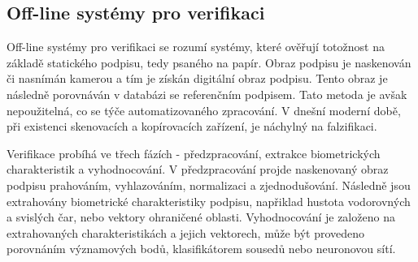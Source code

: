 \subsection{Off-line systémy pro verifikaci}
Off-line systémy pro verifikaci se rozumí systémy, které ověřují totožnost na základě statického podpisu, tedy psaného na papír.  %
Obraz podpisu je naskenován či nasnímán kamerou a tím je získán digitální obraz podpisu.                                          %
Tento obraz je následně porovnáván v databázi se referenčním podpisem.                                                            %
Tato metoda je avšak nepoužitelná, co se týče automatizovaného zpracování.                                                        %
V dnešní moderní době, při existenci skenovacích a kopírovacích zařízení, je náchylný na falzifikaci.                             %

Verifikace probíhá ve třech fázích - předzpracování, extrakce biometrických charakteristik a vyhodnocování. %
V předzpracování projde naskenovaný obraz podpisu prahováním, vyhlazováním, normalizaci a zjednodušování.   %
Následně jsou extrahovány biometrické charakteristiky podpisu,                                              %
napřiklad hustota vodorovných a svislých čar, nebo vektory ohraničené oblasti.                              %
Vyhodnocování je založeno na extrahovaných charakteristikách a jejich vektorech,                            %
může být provedeno porovnáním významových bodů, klasifikátorem sousedů nebo neuronovou sítí.                %

